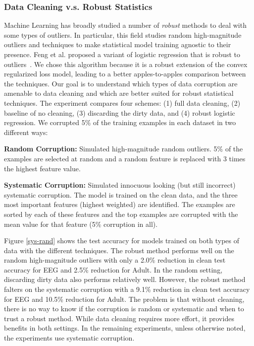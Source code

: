 \subsubsection{Data Cleaning v.s. Robust Statistics}
Machine Learning has broadly studied a number of \emph{robust} methods to deal with some types of outliers. In particular, this field studies random high-magnitude outliers and techniques to make statistical model training agnostic to their presence. Feng et al. proposed a variant of logistic regression that is robust to outliers~\cite{feng2014robust}. We chose this algorithm because it is a robust extension of the convex regularized loss model, leading to a better apples-to-apples comparison between the techniques.
Our goal is to understand which types of data corruption are amenable to data cleaning and which are better suited for robust statistical techniques.
The experiment compares four schemes: (1) full data cleaning, (2) baseline of no cleaning, (3) discarding the dirty data, and (4) robust logistic regression. 
We corrupted 5\% of the training examples in each dataset in two different ways:

\vspace{0.5em}

\noindent\textbf{Random Corruption: } Simulated high-magnitude random outliers. 5\% of the examples are selected at random and a random feature is replaced with 3 times the highest feature value.

\vspace{0.5em}

\noindent\textbf{Systematic Corruption: } Simulated innocuous looking (but still incorrect) systematic corruption. The model is trained on the clean data, and the three most important features (highest weighted) are identified. The examples are sorted by each of these features and the top examples are corrupted with the mean value for that feature (5\% corruption in all). 

Figure \ref{sys-rand} shows the test accuracy for models trained on both types of data with the different techniques.
The robust method performs well on the random high-magnitude outliers with only a 2.0\% reduction in clean test accuracy for EEG and 2.5\% reduction for Adult.
In the random setting, discarding dirty data also performs relatively well.
However, the robust method falters on the systematic corruption with a 9.1\% reduction in clean test accuracy for EEG and 10.5\% reduction for Adult.
The problem is that without cleaning, there is no way to know if the corruption is random or systematic and when to trust a robust method.
While data cleaning requires more effort, it provides benefits in both settings.
In the remaining experiments, unless otherwise noted, the experiments use systematic corruption.

